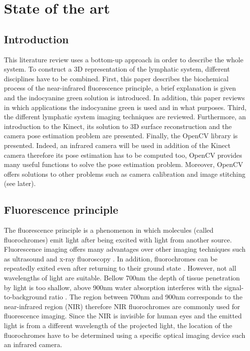 \chapter[State of the art]{State of the art}
\section{Introduction}
This literature review uses a bottom-up approach in order to describe the whole system. To construct a 3D representation of the lymphatic system, different disciplines have to be combined. First, this paper describes the biochemical process of the near-infrared fluorescence principle, a brief explanation is given and the indocyanine green solution is introduced. In addition, this paper reviews in which applications the indocyanine green is used and in what purposes. Third, the different lymphatic system imaging techniques are reviewed. Furthermore, an introduction to the Kinect, its solution to 3D surface reconstruction and the camera pose estimation problem are presented. Finally, the OpenCV library is presented. Indeed, an infrared camera will be used in addition of the Kinect camera therefore its pose estimation has to be computed too, OpenCV provides many useful functions to solve the pose estimation problem. Moreover, OpenCV offers solutions to other problems such as camera calibration and image stitching (see later).

\section{Fluorescence principle}
\label{sec:fluorescence principle}
The fluorescence principle is a phenomenon in which molecules (called fluorochromes) emit light after being excited with light from another source. Fluorescence imaging offers many advantages over other imaging techniques such as ultrasound and x-ray fluoroscopy \cite{troyan_flare_2009}. In addition, fluorochromes can be repeatedly exited even after returning to their ground state \cite{marshall_near-infrared_2010}. However, not all wavelengths of light are suitable. Bellow 700nm the depth of tissue penetration by light is too shallow, above 900nm water absorption interferes with the signal-to-background ratio \cite{kovar_systematic_2007}. The region between 700nm and 900nm corresponds to the near-infrared region (NIR) therefore NIR fluorochromes are commonly used for fluorescence imaging. 
Since the NIR is invisible for human eyes and the emitted light is from a different wavelength of the projected light, the location of the fluorochromes have to be determined using a specific optical imaging device such an infrared camera.\\

